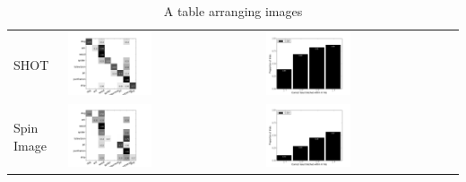 \begin{table}
\begin{tabular}{m{} m{} m{}}
  SHOT & \includegraphics[width=0.45\textwidth,clip=true]{../figures/PSB/SHOT_confmat.png} & \includegraphics[width=0.45\textwidth,clip=true]{../figures/PSB/SHOT_rankhist.png} \\
  Spin Image & \includegraphics[width=0.45\textwidth,clip=true]{../figures/PSB/SPIN_IMAGE_confmat.png} & \includegraphics[width=0.45\textwidth,clip=true]{../figures/PSB/SPIN_IMAGE_rankhist.png} \\
\end{tabular}
\caption{A table arranging images}
\label{tab:gt}
\end{table}